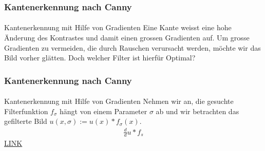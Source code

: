 \documentclass{beamer}
\begin{document}
\begin{frame}
    \frametitle{Kantenerkennung nach Canny}
\framesubtitle{}

\begin{block}{Kantenerkennung mit Hilfe von Gradienten}
Eine Kante weisst eine hohe Änderung des Kontrastes und damit einen grossen Gradienten auf. Um grosse Gradienten zu vermeiden, die durch Rauschen verursacht werden, möchte wir das Bild vorher glätten. Doch welcher Filter ist hierfür Optimal?
 
\end{block}

 \end{frame}

\begin{frame}
    \frametitle{Kantenerkennung nach Canny}
\framesubtitle{}

\begin{block}{Kantenerkennung mit Hilfe von Gradienten}
Nehmen wir an, die gesuchte  Filterfunktion $f_\sigma$ hängt von einem Parameter $\sigma$ ab  und wir betrachten das gefilterte Bild $u(x, \sigma) := u(x) *f_\sigma (x)$.
 \begin{align*}
\frac{d}{d} u * f_s
\end{align*}
\href{https://www.youtube.com/watch?v=ToIXSwZ1pJU}{LINK}
\end{block}
 \end{frame}
\end{document}
